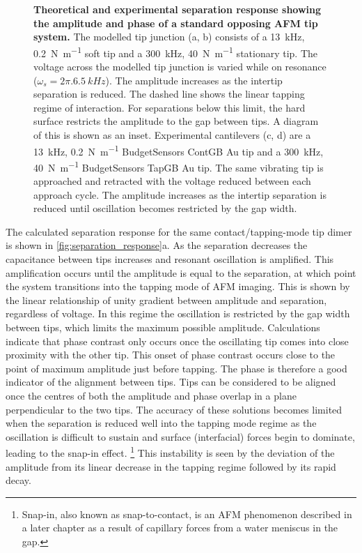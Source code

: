 \documentclass{article}
\begin{document}
\begin{figure}[bt]
{\caption[Theoretical and experimental separation response showing the amplitude and phase of a standard opposing AFM tip system]{\textbf{Theoretical and experimental separation response showing the amplitude and phase of a standard opposing AFM tip system.} The modelled tip junction (a, b) consists of a \SI{13}{kHz}, \SI{0.2}{N.m^{-1}} soft tip and a \SI{300}{kHz}, \SI{40}{N.m^{-1}} stationary tip. The voltage across the modelled tip junction is varied while on resonance ($\omega_s = 2\pi.\SI{6.5}{kHz}$). The amplitude increases as the intertip separation is reduced. The dashed line shows the linear tapping regime of interaction. For separations below this limit, the hard surface restricts the amplitude to the gap between tips. A diagram of this is shown as an inset. Experimental cantilevers (c, d) are a \SI{13}{kHz}, \SI{0.2}{N.m^{-1}} BudgetSensors ContGB Au tip and a \SI{300}{kHz}, \SI{40}{N.m^{-1}} BudgetSensors TapGB Au tip. The same vibrating tip is approached and retracted with the voltage reduced between each approach cycle. The amplitude increases as the intertip separation is reduced until oscillation becomes restricted by the gap width.}
\label{fig:separation_response}}
\end{figure}

The calculated separation response for the same contact/tapping-mode tip dimer is shown in \autoref{fig:separation_response}a. As the separation decreases the capacitance between tips increases and resonant oscillation is amplified. This amplification occurs until the amplitude is equal to the separation, at which point the system transitions into the tapping mode of AFM imaging. This is shown by the linear relationship of unity gradient between amplitude and separation, regardless of voltage. In this regime the oscillation is restricted by the gap width between tips, which limits the maximum possible amplitude.
Calculations indicate that phase contrast only occurs once the oscillating tip comes into close proximity with the other tip. This onset of phase contrast occurs close to the point of maximum amplitude just before tapping. The phase is therefore a good indicator of the alignment between tips. Tips can be considered to be aligned once the centres of both the amplitude and phase overlap in a plane perpendicular to the two tips. The accuracy of these solutions becomes limited when the separation is reduced well into the tapping mode regime as the oscillation is difficult to sustain and surface (interfacial) forces begin to dominate, leading to the snap-in effect.%
\footnote{Snap-in, also known as snap-to-contact, is an AFM phenomenon described in a later chapter as a result of capillary forces from a water meniscus in the gap.}
This instability is seen by the deviation of the amplitude from its linear decrease in the tapping regime followed by its rapid decay.
\end{document}

